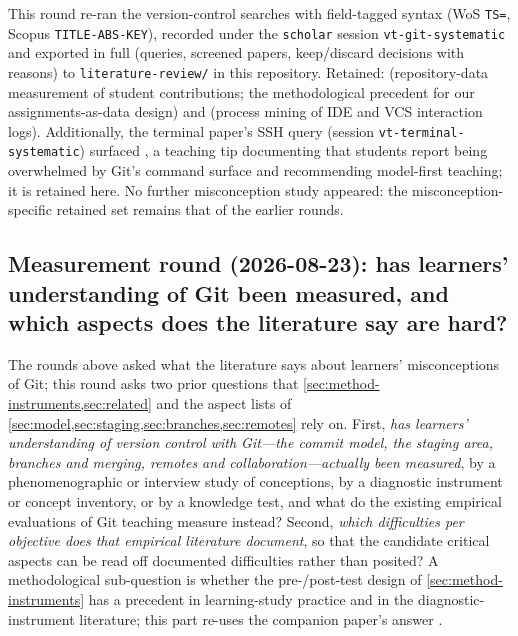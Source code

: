 This round re-ran the version-control searches with field-tagged syntax
(WoS \texttt{TS=}, Scopus \texttt{TITLE-ABS-KEY}), recorded under the
\texttt{scholar} session \texttt{vt-git-systematic} and exported in full
(queries, screened papers, keep/discard decisions with reasons) to
\texttt{literature-review/} in this repository.
Retained: \autocite{Hamer2021GitMetrics} (repository-data measurement of
student contributions; the methodological precedent for our
assignments-as-data design) and \autocite{Ardimento2022ProcessMining}
(process mining of IDE and VCS interaction logs).
Additionally, the terminal paper's SSH query (session
\texttt{vt-terminal-systematic}) surfaced
\autocite{Wagner2025RethinkGit}, a teaching tip documenting that students
report being overwhelmed by Git's command surface and recommending
model-first teaching; it is retained here.
No further misconception study appeared: the misconception-specific
retained set remains that of the earlier rounds.

\subsection{Measurement round (2026-08-23): has learners' understanding of
Git been measured, and which aspects does the literature say are hard?}
\label{sec:protocol-measurement}

The rounds above asked what the literature says about learners'
misconceptions of Git; this round asks two prior questions that
\cref{sec:method-instruments,sec:related} and the aspect lists of
\cref{sec:model,sec:staging,sec:branches,sec:remotes} rely on.
First, \emph{has learners' understanding of version control with
Git---the commit model, the staging area, branches and merging, remotes
and collaboration---actually been measured}, by a phenomenographic or
interview study of conceptions, by a diagnostic instrument or concept
inventory, or by a knowledge test, and what do the existing empirical
evaluations of Git teaching measure instead?
Second, \emph{which difficulties per objective does that empirical
literature document}, so that the candidate critical aspects can be read
off documented difficulties rather than posited?
A methodological sub-question is whether the pre-/post-test design of
\cref{sec:method-instruments} has a precedent in learning-study practice
and in the diagnostic-instrument literature; this part re-uses the
companion paper's answer \autocite{VTTerminal}.

